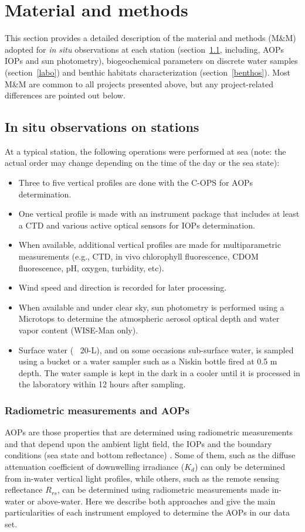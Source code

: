\documentclass[essd, manuscript]{copernicus}
\begin{document}
\section{Material and methods}
This section provides a detailed description of the material and methods (M\&M) adopted for \textit{in situ} observations at each station (section~\ref{insitu}, including, AOPs IOPs and sun photometry), biogeochemical parameters on discrete water samples (section~\ref{labo}) and benthic habitats characterization (section~\ref{benthos}). Most M\&M are common to all projects presented above, but any project-related differences are pointed out below. 

\subsection{In situ observations on stations} \label{insitu}
At a typical station, the following operations were performed at sea (note: the actual order may change depending on the time of the day or the sea state):
\begin{itemize}
  \item Three to five vertical profiles are done with the C-OPS for AOPs  determination.
  \item One vertical profile is made with an instrument package that includes at least a CTD and various active optical sensors for IOPs determination.
  \item When available, additional vertical profiles are made for multiparametric measurements (e.g., CTD, in vivo chlorophyll fluorescence, CDOM fluorescence, pH, oxygen, turbidity, etc).
  \item Wind speed and direction is recorded for later processing. 
  \item When available and under clear sky, sun photometry is performed using a Microtops to determine the atmospheric aerosol optical depth and water vapor content (WISE-Man only).
  \item Surface water (~ 20-L), and on some occasions sub-surface water, is sampled using a bucket or a water sampler such as a Niskin bottle fired at 0.5 m depth. The water sample is kept in the dark in a cooler until it is processed in the laboratory within 12 hours after sampling.
\end{itemize}

\subsubsection{Radiometric measurements and AOPs}
AOPs are those properties that are determined using radiometric measurements and that depend upon the ambient light field, the IOPs and the boundary conditions (sea state and bottom reflectance) \citep{Preisendorfer1961}.  Some of them, such as the diffuse attenuation coefficient of downwelling irradiance ($K_d$) can only be determined from in-water vertical light profiles, while others, such as the remote sensing reflectance $R_{rs}$, can be determined using radiometric measurements made in-water or above-water.  Here we describe both approaches and give the main particularities of each instrument employed to determine the AOPs in our data set.\\  
\end{document}
